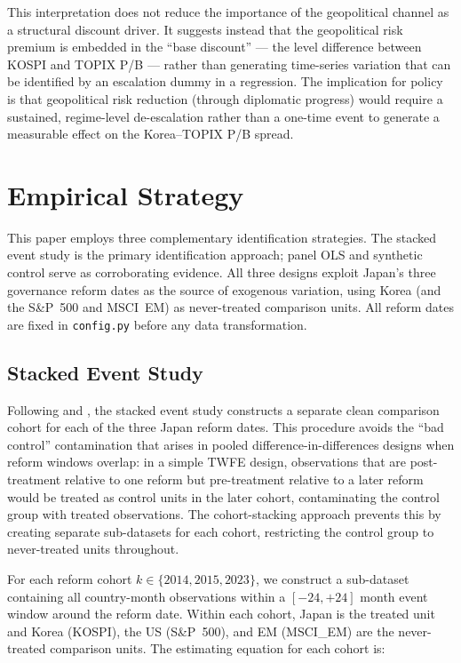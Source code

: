 \documentclass[12pt]{article}
\begin{document}
This interpretation does not reduce the importance of the geopolitical channel as a structural
discount driver. It suggests instead that the geopolitical risk premium is embedded in the
``base discount'' --- the level difference between KOSPI and TOPIX P/B --- rather than
generating time-series variation that can be identified by an escalation dummy in a regression.
The implication for policy is that geopolitical risk reduction (through diplomatic progress)
would require a sustained, regime-level de-escalation rather than a one-time event to generate
a measurable effect on the Korea--TOPIX P/B spread.

\section{Empirical Strategy}
\label{sec:strategy}

This paper employs three complementary identification strategies. The stacked event study is
the primary identification approach; panel OLS and synthetic control serve as corroborating
evidence. All three designs exploit Japan's three governance reform dates as the source of
exogenous variation, using Korea (and the S\&P~500 and MSCI~EM) as never-treated comparison
units. All reform dates are fixed in \texttt{config.py} before any data transformation.

\subsection{Stacked Event Study}

Following \citet{cengiz2019} and \citet{baker2022}, the stacked event study constructs a
separate clean comparison cohort for each of the three Japan reform dates. This procedure
avoids the ``bad control'' contamination that arises in pooled difference-in-differences
designs when reform windows overlap: in a simple TWFE design, observations that are
post-treatment relative to one reform but pre-treatment relative to a later reform would be
treated as control units in the later cohort, contaminating the control group with treated
observations. The cohort-stacking approach prevents this by creating separate sub-datasets
for each cohort, restricting the control group to never-treated units throughout.

For each reform cohort $k \in \{2014, 2015, 2023\}$, we construct a sub-dataset containing
all country-month observations within a $[-24, +24]$ month event window around the reform
date. Within each cohort, Japan is the treated unit and Korea (KOSPI), the US (S\&P~500),
and EM (MSCI\_EM) are the never-treated comparison units. The estimating equation for each
cohort is:
\end{document}
